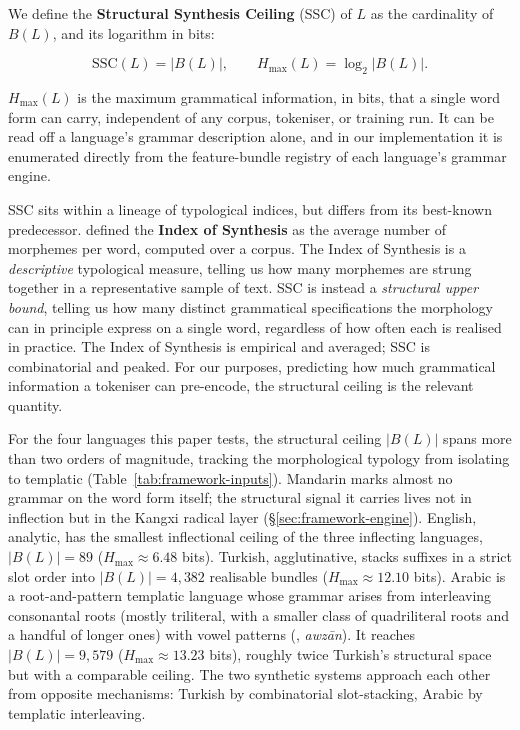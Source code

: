 We define the \textbf{Structural Synthesis Ceiling} (SSC) of $L$ as the cardinality of $B(L)$, and its logarithm in bits:

\begin{equation}
\mathrm{SSC}(L) = |B(L)|, \qquad H_{\max}(L) = \log_2 |B(L)|.
\label{eq:ssc}
\end{equation}

$H_{\max}(L)$ is the maximum grammatical information, in bits, that a single word form can carry, independent of any corpus, tokeniser, or training run. It can be read off a language's grammar description alone, and in our implementation it is enumerated directly from the feature-bundle registry of each language's grammar engine.

SSC sits within a lineage of typological indices, but differs from its best-known predecessor. \citet{greenberg1960} defined the \textbf{Index of Synthesis} as the average number of morphemes per word, computed over a corpus. The Index of Synthesis is a \emph{descriptive} typological measure, telling us how many morphemes are strung together in a representative sample of text. SSC is instead a \emph{structural upper bound}, telling us how many distinct grammatical specifications the morphology can in principle express on a single word, regardless of how often each is realised in practice. The Index of Synthesis is empirical and averaged; SSC is combinatorial and peaked. For our purposes, predicting how much grammatical information a tokeniser can pre-encode, the structural ceiling is the relevant quantity.

For the four languages this paper tests, the structural ceiling $|B(L)|$ spans more than two orders of magnitude, tracking the morphological typology from isolating to templatic (Table~\ref{tab:framework-inputs}). Mandarin marks almost no grammar on the word form itself; the structural signal it carries lives not in inflection but in the Kangxi radical layer (\S\ref{sec:framework-engine}). English, analytic, has the smallest inflectional ceiling of the three inflecting languages, $|B(L)| = 89$ ($H_{\max} \approx 6.48$ bits). Turkish, agglutinative, stacks suffixes in a strict slot order into $|B(L)| = 4{,}382$ realisable bundles ($H_{\max} \approx 12.10$ bits). Arabic is a root-and-pattern templatic language whose grammar arises from interleaving consonantal roots (mostly triliteral, with a smaller class of quadriliteral roots and a handful of longer ones) with vowel patterns (, \emph{awz\=an}). It reaches $|B(L)| = 9{,}579$ ($H_{\max} \approx 13.23$ bits), roughly twice Turkish's structural space but with a comparable ceiling. The two synthetic systems approach each other from opposite mechanisms: Turkish by combinatorial slot-stacking, Arabic by templatic interleaving.

